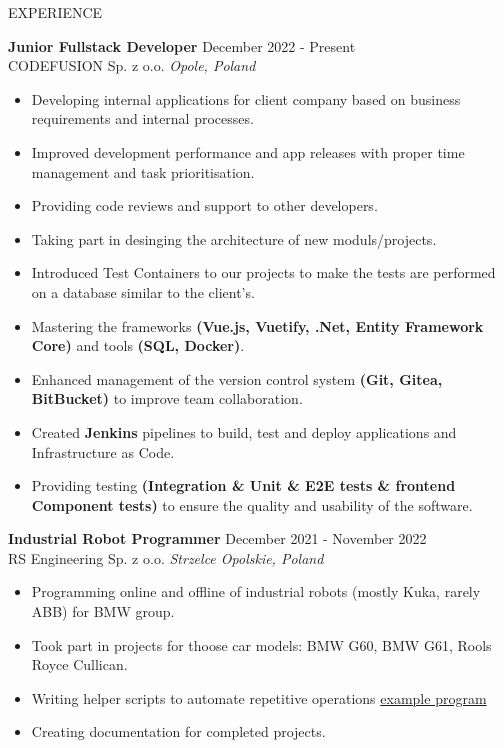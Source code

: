 \documentclass{resume}
\begin{document}
\begin{rSection}{EXPERIENCE}

\textbf{Junior Fullstack Developer} \hfill December 2022 - Present \\ [0.4em]
CODEFUSION Sp. z o.o. \hfill \textit{Opole, Poland}
\begin{itemize}[leftmargin=0.5cm]
\itemsep-3pt {}
    \item Developing internal applications for client company based on business requirements and internal processes.
    \item Improved development performance and app releases with proper time management and task prioritisation.
    \item Providing code reviews and support to other developers. 
    \item Taking part in desinging the architecture of new moduls/projects.
    \item Introduced Test Containers to our projects to make the tests are performed on a database similar to the client's.
    \item Mastering the frameworks \textbf{(Vue.js, Vuetify, .Net, Entity Framework Core)} and tools \textbf{(SQL, Docker)}.
    \item Enhanced management of the version control system \textbf{(Git, Gitea, BitBucket)} to improve team collaboration.
    \item Created \textbf{Jenkins} pipelines to build, test and deploy applications and Infrastructure as Code.
    \item Providing testing \textbf{(Integration \& Unit \& E2E tests \& frontend Component tests)} to ensure the quality and usability of the software.
\end{itemize}
\textbf{Industrial Robot Programmer} \hfill December 2021 - November 2022 \\ [0.4em]
RS Engineering Sp. z o.o. \hfill \textit{Strzelce Opolskie, Poland}
\begin{itemize}[leftmargin=0.5cm]
\itemsep-3pt {}
    \item Programming online and offline of industrial robots (mostly Kuka, rarely ABB) for BMW group. 
    \item Took part in projects for thoose car models: BMW G60, BMW G61, Rools Royce Cullican.
    \item Writing helper scripts to automate repetitive operations \href{https://github.com/RoobyJ/KukaGo}{example program}
    \item Creating documentation for completed projects.
\end{itemize}
\end{rSection}
\end{document}
